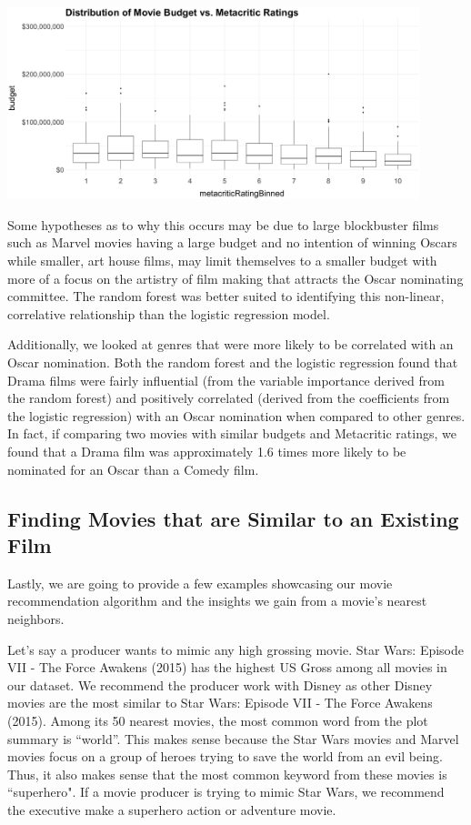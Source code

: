 \documentclass[10pt]{article}
\begin{document}
\begin{center}
\includegraphics[width=12cm]{_assets/_eda/eda__boxplot_budget_vs_metacritic_binned.png}
\end{center}

Some hypotheses as to why this occurs may be due to large blockbuster films such as Marvel movies having a large budget and no intention of winning Oscars while smaller, art house films, may limit themselves to a smaller budget with more of a focus on the artistry of film making that attracts the Oscar nominating committee. The random forest was better suited to identifying this non-linear, correlative relationship than the logistic regression model.

Additionally, we looked at genres that were more likely to be correlated with an Oscar nomination. Both the random forest and the logistic regression found that Drama films were fairly influential (from the variable importance derived from the random forest) and positively correlated (derived from the coefficients from the logistic regression) with an Oscar nomination when compared to other genres. In fact, if comparing two movies with similar budgets and Metacritic ratings, we found that a Drama film was approximately 1.6 times more likely to be nominated for an Oscar than a Comedy film.

\subsection{Finding Movies that are Similar to an Existing Film}

Lastly, we are going to provide a few examples showcasing our movie recommendation algorithm and the insights we gain from a movie’s nearest neighbors.

Let’s say a producer wants to mimic any high grossing movie. Star Wars: Episode VII - The Force Awakens (2015) has the highest US Gross among all movies in our dataset. We recommend the producer work with Disney as other Disney movies are the most similar to Star Wars: Episode VII - The Force Awakens (2015). Among its 50 nearest movies, the most common word from the plot summary is “world”. This makes sense because the Star Wars movies and Marvel movies focus on a group of heroes trying to save the world from an evil being. Thus, it also makes sense that the most common keyword from these movies is ``superhero". If a movie producer is trying to mimic Star Wars, we recommend the executive make a superhero action or adventure movie.
\end{document}
